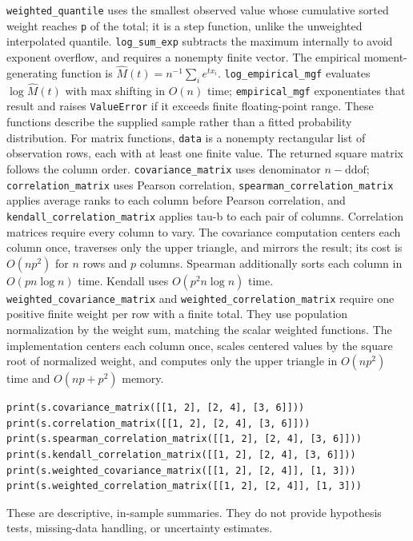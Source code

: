 \documentclass[11pt,a4paper]{article}
\begin{document}
\verb|weighted_quantile| uses the smallest observed value whose cumulative sorted weight reaches \verb|p| of the total; it is a step function, unlike the unweighted interpolated quantile. \verb|log_sum_exp| subtracts the maximum internally to avoid exponent overflow, and requires a nonempty finite vector.
The empirical moment-generating function is $\widehat M(t)=n^{-1}\sum_i e^{t x_i}$. \verb|log_empirical_mgf| evaluates $\log\widehat M(t)$ with max shifting in $O(n)$ time; \verb|empirical_mgf| exponentiates that result and raises \verb|ValueError| if it exceeds finite floating-point range. These functions describe the supplied sample rather than a fitted probability distribution.
For matrix functions, \verb|data| is a nonempty rectangular list of observation rows, each with at least one finite value. The returned square matrix follows the column order. \verb|covariance_matrix| uses denominator $n-\mathrm{ddof}$; \verb|correlation_matrix| uses Pearson correlation, \verb|spearman_correlation_matrix| applies average ranks to each column before Pearson correlation, and \verb|kendall_correlation_matrix| applies tau-b to each pair of columns. Correlation matrices require every column to vary. The covariance computation centers each column once, traverses only the upper triangle, and mirrors the result; its cost is $O(np^2)$ for $n$ rows and $p$ columns. Spearman additionally sorts each column in $O(pn\log n)$ time. Kendall uses $O(p^2n\log n)$ time.
\verb|weighted_covariance_matrix| and \verb|weighted_correlation_matrix| require one positive finite weight per row with a finite total. They use population normalization by the weight sum, matching the scalar weighted functions. The implementation centers each column once, scales centered values by the square root of normalized weight, and computes only the upper triangle in $O(np^2)$ time and $O(np+p^2)$ memory.
\begin{verbatim}
print(s.covariance_matrix([[1, 2], [2, 4], [3, 6]]))
print(s.correlation_matrix([[1, 2], [2, 4], [3, 6]]))
print(s.spearman_correlation_matrix([[1, 2], [2, 4], [3, 6]]))
print(s.kendall_correlation_matrix([[1, 2], [2, 4], [3, 6]]))
print(s.weighted_covariance_matrix([[1, 2], [2, 4]], [1, 3]))
print(s.weighted_correlation_matrix([[1, 2], [2, 4]], [1, 3]))
\end{verbatim}
These are descriptive, in-sample summaries. They do not provide hypothesis tests, missing-data handling, or uncertainty estimates.
\end{document}
